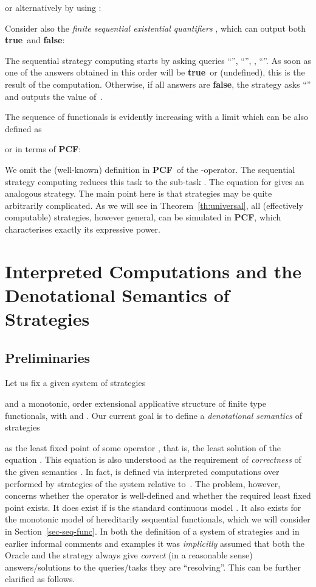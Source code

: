 \documentclass[fleqn]{LMCS}
\theoremstyle{plain}\newtheorem{satz}[thm]{Satz}
\theoremstyle{plain}\newtheorem{hyp}[thm]{Hypothesis}
\theoremstyle{plain}\newtheorem{hyps}[thm]{Hypotheses}
\theoremstyle{definition}\newtheorem{note}[thm]{Note}
\newcommand{\PCF}{\mbox{\bf PCF}}
\newcommand{\?}{\mbox{?}}
\newcommand{\false}{\mbox{\bf false}}
\newcommand{\true}{\mbox{\bf true}}
\begin{document}
or alternatively by using 
: 



Consider also the \emph{finite sequential existential quantifiers} 
,  which can output 
both \true\ and \false:

The sequential strategy computing   
starts by asking  queries 
``'', ``'', , ``''. 
As soon as one of the answers obtained in this order 
will be \true\ or  (undefined), this is the result of the computation. 
Otherwise, 
if all answers are \false, the strategy asks 
``'' and outputs the 
value of~. 

The sequence of functionals  is evidently increasing with a limit 
 which can be also defined as 

or in terms of \PCF:

We omit the (well-known) definition in \PCF\ of the 
-operator. 
The sequential strategy computing  reduces this task 
to the sub-task . The equation for  
gives an analogous strategy. 
The main point here is that strategies may be quite arbitrarily complicated. 
As we will 
see in Theorem~\ref{th:universal}, all (effectively computable) strategies, 
however general, can be simulated in \PCF, which 
characterises exactly its expressive power. 

\section{Interpreted Computations and the Denotational 
Semantics of Strategies}
\label{sec-seq-stra-den-sem}

\subsection{Preliminaries}
\label{sec-seq-stra-den-sem-prelim}

\noindent
Let us fix a given system of strategies 
 
and a monotonic, order extensional applicative structure 
 of finite type functionals, with  
and . 
Our current goal is to define a \emph{denotational semantics} 
of strategies 

as the least fixed point of some operator 
, that is, 
the least solution of the equation . 
This equation is also understood as the requirement of 
\emph{correctness} of the given semantics 
. 
In fact,  is defined via 
interpreted computations over  
performed by strategies of the system 
 relative to~. 
The problem, however, concerns whether the operator 
 is well-defined and 
whether the required least fixed point  exists. 
It does exist if  is the standard continuous model 
.
It also exists for 
the monotonic model  of hereditarily 
sequential functionals, which we will 
consider in Section~\ref{sec-seq-func}. 
In both the definition of a system of strategies  and in 
earlier informal comments and examples 
it was \emph{implicitly}
assumed that both the Oracle and the strategy  always give {\em correct\/}
(in a reasonable sense) answers/solutions 
to the queries/tasks they are
``resolving''. 
This can be further clarified as follows.
\nopagebreak
\end{document}
